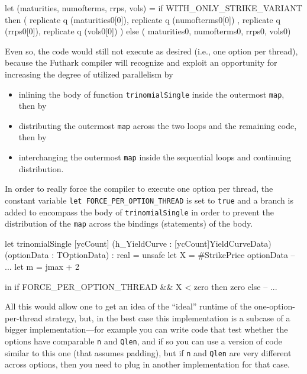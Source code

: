 \documentclass[a4paper,11pt]{article}
\begin{document}
\begin{fancycode}
  let (maturities, numofterms, rrps, vols) =
      if WITH_ONLY_STRIKE_VARIANT
      then ( replicate q (maturities0[0]), replicate q (numofterms0[0])
           , replicate q (rrps0[0]), replicate q (vols0[0])            )
      else ( maturities0, numofterms0, rrps0, vols0)
\end{fancycode}

Even so, the code would still not execute as desired (i.e., one option 
per thread), because the Futhark compiler will recognize and exploit
an opportunity for increasing the degree of utilized parallelism by
\begin{itemize}
    \item inlining the body of function {\tt trinomialSingle} inside
            the outermost {\tt map}, then by
    \item distributing the outermost {\tt map} across the two loops
            and the remaining code, then by
    \item interchanging the outermost {\tt map} inside the sequential
            loops and continuing distribution.
\end{itemize} 

In order to really force the compiler to execute one option per 
thread, the constant variable {\tt let FORCE\_PER\_OPTION\_THREAD} 
is set to {\tt true} and a branch is added to encompass the body 
of {\tt trinomialSingle} in order to prevent the distribution of
the {\tt map} across the bindings (statements) of the body.

\begin{fancycode}
let trinomialSingle [ycCount]
                    (h_YieldCurve : [ycCount]YieldCurveData)
                    (optionData : TOptionData) : real = unsafe
  let X  = #StrikePrice   optionData
  -- ...
  let m  = jmax + 2

  in if FORCE_PER_OPTION_THREAD && X < zero 
     then zero else
  -- ...
\end{fancycode}

All this would allow one to get an idea of the ``ideal'' runtime
of the one-option-per-thread strategy, but, in the best case this
implementation is a subcase of a bigger implementation---for example
you can write code that test whether the options have comparable 
{\tt n} and {\tt Qlen}, and if so you can use a version of code 
similar to this one (that assumes padding), but if {\tt n} and 
{\tt Qlen} are very different across options, then you need to 
plug in another implementation for that case.
\end{document}

